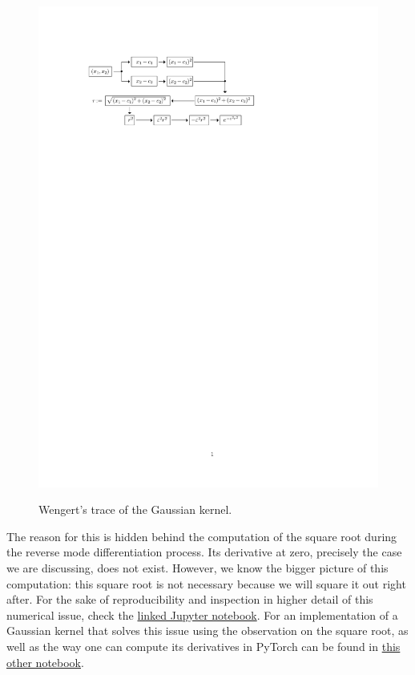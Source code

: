 \documentclass[12pt]{report} %
\begin{document}
\begin{figure}[ht]
  {\includegraphics[width=.85\textwidth, trim={2cm 22cm 7cm 3cm}, clip=true]{imagenes/rbf_discussion/diagrama-gaussian-wengert.pdf}}
  \caption{Wengert's trace of the Gaussian kernel.}
  \label{fig:wenger-trace-gaussian}
\end{figure}

The reason for this is hidden behind the computation of the square root during the reverse
mode differentiation process. Its derivative at zero, precisely the case we
are discussing, does not exist.
However, we know the bigger picture of this computation: this square root is not
necessary because we will square it out right after. For the sake of reproducibility
and inspection in higher detail of this numerical issue, check the
\href{https://github.com/heqro/tfm-experiments/blob/main/introductory_notebooks/differentials_computation/differentials_rbf_NANs.ipynb}{linked
  Jupyter notebook}. For an implementation of a Gaussian kernel that solves this issue
using the observation on the square root, as well
as the way one can compute its derivatives in PyTorch can be found in
\href{https://github.com/heqro/tfm-experiments/blob/main/introductory_notebooks/differentials_computation/differentials_rbf_NANs_fixed.ipynb}
{this other notebook}.
\end{document}

